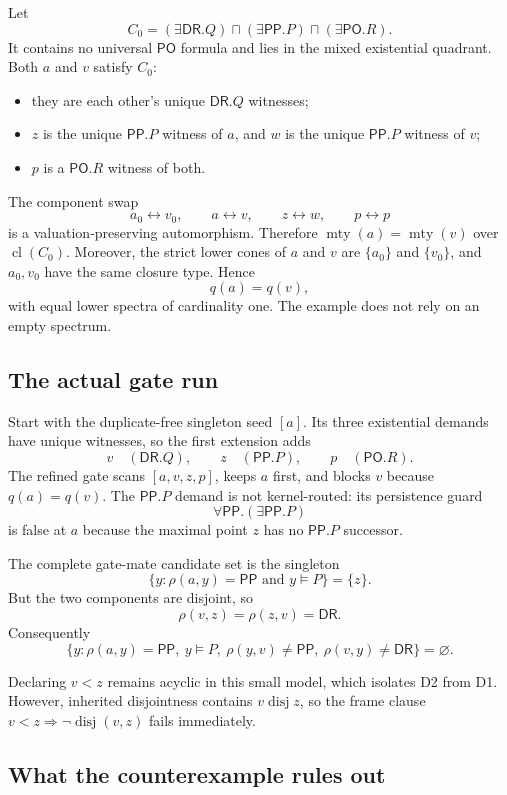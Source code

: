 \documentclass[11pt]{article}
\newcommand{\PP}{\mathsf{PP}}
\newcommand{\PO}{\mathsf{PO}}
\newcommand{\DR}{\mathsf{DR}}
\newcommand{\mty}{\operatorname{mty}}
\newcommand{\cl}{\operatorname{cl}}
\begin{document}
Let
\[
  C_0=(\exists\DR.Q)\sqcap(\exists\PP.P)\sqcap(\exists\PO.R).
\]
It contains no universal $\PO$ formula and lies in the mixed existential quadrant.
Both $a$ and $v$ satisfy $C_0$:

\begin{itemize}
  \item they are each other's unique $\DR.Q$ witnesses;
  \item $z$ is the unique $\PP.P$ witness of $a$, and $w$ is the unique
        $\PP.P$ witness of $v$;
  \item $p$ is a $\PO.R$ witness of both.
\end{itemize}

The component swap
\[
  a_0\leftrightarrow v_0,\qquad a\leftrightarrow v,\qquad z\leftrightarrow w,
  \qquad p\leftrightarrow p
\]
is a valuation-preserving automorphism. Therefore
$\mty(a)=\mty(v)$ over $\cl(C_0)$. Moreover, the strict lower cones of $a$ and $v$
are $\{a_0\}$ and $\{v_0\}$, and $a_0,v_0$ have the same closure type. Hence
\[
  q(a)=q(v),
\]
with equal lower spectra of cardinality one. The example does not rely on an empty
spectrum.

\subsection{The actual gate run}

Start with the duplicate-free singleton seed $[a]$. Its three existential demands have
unique witnesses, so the first extension adds
\[
  v\quad(\DR.Q),\qquad z\quad(\PP.P),\qquad p\quad(\PO.R).
\]
The refined gate scans $[a,v,z,p]$, keeps $a$ first, and blocks $v$ because
$q(a)=q(v)$. The $\PP.P$ demand is not kernel-routed: its persistence guard
\[
  \forall\PP.(\exists\PP.P)
\]
is false at $a$ because the maximal point $z$ has no $\PP.P$ successor.

The complete gate-mate candidate set is the singleton
\[
  \{y:\rho(a,y)=\PP\text{ and }y\models P\}=\{z\}.
\]
But the two components are disjoint, so
\[
  \rho(v,z)=\rho(z,v)=\DR.
\]
Consequently
\[
  \{y:\rho(a,y)=\PP,\ y\models P,\ \rho(y,v)\neq\PP,
        \ \rho(v,y)\neq\DR\}=\varnothing.
\]

Declaring $v<z$ remains acyclic in this small model, which isolates D2 from D1.
However, inherited disjointness contains $v\mathrel{\operatorname{disj}}z$, so the
frame clause $v<z\Rightarrow\neg\operatorname{disj}(v,z)$ fails immediately.

\subsection{What the counterexample rules out}
\end{document}
